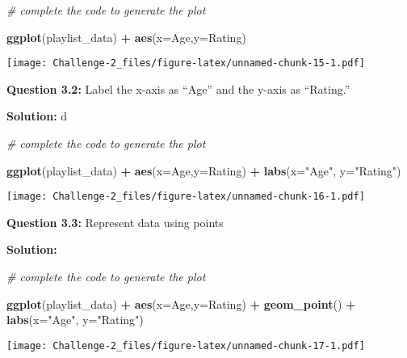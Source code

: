 \documentclass[
]{article}
\newenvironment{Shaded}{\begin{snugshade}}{\end{snugshade}}
\newcommand{\AttributeTok}[1]{\textcolor[rgb]{0.13,0.29,0.53}{#1}}
\newcommand{\CommentTok}[1]{\textcolor[rgb]{0.56,0.35,0.01}{\textit{#1}}}
\newcommand{\FunctionTok}[1]{\textcolor[rgb]{0.13,0.29,0.53}{\textbf{#1}}}
\newcommand{\NormalTok}[1]{#1}
\newcommand{\SpecialCharTok}[1]{\textcolor[rgb]{0.81,0.36,0.00}{\textbf{#1}}}
\newcommand{\StringTok}[1]{\textcolor[rgb]{0.31,0.60,0.02}{#1}}
\begin{document}
\begin{Shaded}
\begin{Highlighting}[]
\CommentTok{\# complete the code to generate the plot}

\FunctionTok{ggplot}\NormalTok{(playlist\_data) }\SpecialCharTok{+} \FunctionTok{aes}\NormalTok{(}\AttributeTok{x=}\NormalTok{Age,}\AttributeTok{y=}\NormalTok{Rating)}
\end{Highlighting}
\end{Shaded}

\texttt{[image: Challenge-2\_files/figure-latex/unnamed-chunk-15-1.pdf]}

\textbf{Question 3.2:} Label the x-axis as ``Age'' and the y-axis as
``Rating.''

\textbf{Solution:} d

\begin{Shaded}
\begin{Highlighting}[]
\CommentTok{\# complete the code to generate the plot}

\FunctionTok{ggplot}\NormalTok{(playlist\_data) }\SpecialCharTok{+} \FunctionTok{aes}\NormalTok{(}\AttributeTok{x=}\NormalTok{Age,}\AttributeTok{y=}\NormalTok{Rating) }\SpecialCharTok{+} 
  \FunctionTok{labs}\NormalTok{(}\AttributeTok{x=}\StringTok{"Age"}\NormalTok{, }\AttributeTok{y=}\StringTok{"Rating"}\NormalTok{)}
\end{Highlighting}
\end{Shaded}

\texttt{[image: Challenge-2\_files/figure-latex/unnamed-chunk-16-1.pdf]}

\textbf{Question 3.3:} Represent data using points

\textbf{Solution:}

\begin{Shaded}
\begin{Highlighting}[]
\CommentTok{\# complete the code to generate the plot}

\FunctionTok{ggplot}\NormalTok{(playlist\_data) }\SpecialCharTok{+} \FunctionTok{aes}\NormalTok{(}\AttributeTok{x=}\NormalTok{Age,}\AttributeTok{y=}\NormalTok{Rating) }\SpecialCharTok{+} \FunctionTok{geom\_point}\NormalTok{() }\SpecialCharTok{+}
  \FunctionTok{labs}\NormalTok{(}\AttributeTok{x=}\StringTok{"Age"}\NormalTok{, }\AttributeTok{y=}\StringTok{"Rating"}\NormalTok{)}
\end{Highlighting}
\end{Shaded}

\texttt{[image: Challenge-2\_files/figure-latex/unnamed-chunk-17-1.pdf]}
\end{document}
